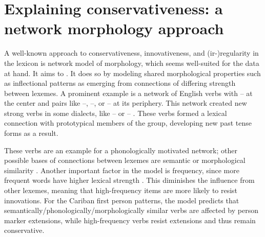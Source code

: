 \section{Explaining conservativeness: a network morphology approach}
\label{sec:motivations}
A well-known approach to conservativeness, innovativeness, and (ir-){}re\-gu\-la\-ri\-ty in the lexicon is  network model of morphology, which seems well-suited for the data at hand.
It aims to  \parencite[428]{bybee1995regular}.
It does so by modeling shared morphological properties such as inflectional patterns as emerging from connections of differing strength between lexemes.
A prominent example is a network of  English verbs with -- at the center and pairs like --, --, or -- at its periphery.
This network created new strong verbs in some dialects, like -- or -- \parencite[129--130]{bybee1985morphology}.
These verbs formed a lexical connection with prototypical members of the group, developing new past tense forms as a result.

These verbs are an example for a phonologically motivated network; other possible bases of connections between lexemes are semantic or morphological similarity \parencite[118]{bybee1985morphology}.
Another important factor in the model is frequency, since more frequent words have higher lexical strength \parencite[119]{bybee1985morphology}.
This diminishes the influence from other lexemes, meaning that high-frequency items are more likely to resist innovations.
For the Cariban first person patterns, the model predicts that semantically\slash{}phonologically\slash\hspace{0pt}morphologically similar verbs are affected by person marker extensions, while high-frequency verbs resist extensions and thus remain conservative.


